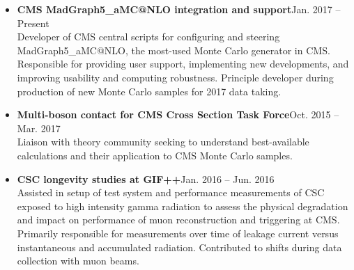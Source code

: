 \documentclass[10pt]{res} %
\begin{document}
\begin{resume}
\begin{itemize}
  \item\textbf{CMS MadGraph5\_aMC@NLO integration and support}\hfill{Jan. 2017 -- Present} \\
    Developer of CMS central scripts
    for configuring and steering MadGraph5\_aMC@NLO, the most-used Monte Carlo generator in CMS. Responsible for 
    providing user support, implementing new developments, 
    and improving usability and computing robustness. Principle developer during production
    of new Monte Carlo samples for 2017 data taking.

  \item\textbf{Multi-boson contact for CMS Cross Section Task Force}\hfill{Oct. 2015 -- Mar. 2017} \\
    Liaison with theory community seeking to understand best-available calculations and 
    their application to CMS Monte Carlo samples. 

  \item\textbf{CSC longevity studies at GIF++}\hfill{Jan. 2016 -- Jun. 2016} \\
    Assisted in setup of test system and performance measurements
    of CSC exposed to high intensity gamma radiation to assess the physical degradation and impact on performance
    of muon reconstruction and triggering at CMS. Primarily responsible for measurements over time of leakage current
    versus instantaneous and accumulated radiation. Contributed to shifts during data collection with muon beams.
\end{itemize}


\end{resume}
\end{document}
